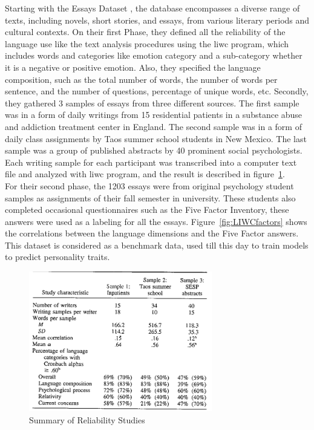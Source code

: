 Starting with the Essays Dataset \cite{pennebaker1999linguistic}, the database encompasses a diverse range of texts, including novels, short stories, and essays, from various literary periods and cultural contexts. On their first Phase, they defined all the reliability of the language use like the text analysis procedures using the \ac{liwc} program, which includes words and categories like emotion category and a sub-category whether it is a negative or positive emotion. Also, they specified the language composition, such as the total number of words, the number of words per sentence, and the number of questions, percentage of unique words, etc. Secondly, they gathered 3 samples of essays from three different sources. The first sample was in a form of daily writings from 15 residential patients in a substance abuse and addiction treatment center in England. The second sample was in a form of daily class assignments by Taos summer school students in New Mexico. The last sample was a group of published abstracts by 40 prominent social psychologists. Each writing sample for each participant was transcribed into a computer text file and analyzed with \ac{liwc} program, and the result is described in figure~\ref{fig:reliabilityStudies}.\\
For their second phase, the 1203 essays were from original psychology student samples as assignments of their fall semester in university. These students also completed occasional questionnaires such as the Five Factor Inventory, these answers were used as a labeling for all the essays. Figure~\ref{fig:LIWCfactors} shows the correlations between the language dimensions and the Five Factor answers. This dataset is considered as a benchmark data, used till this day to train models to predict personality traits.

\begin{figure}[H]
\centering
\includegraphics[width=8cm]{Table1}
\caption{Summary of Reliability Studies\cite{mairesse2007using}}
\label{fig:reliabilityStudies}
\end{figure}

